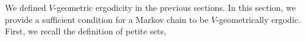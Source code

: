 \documentclass[11pt]{amsart}
\newcommand{\psirr}{$\psi$-irreducible }
\newtheorem{defn}{Definition}[section]
\begin{document}





We defined $V$-geometric ergodicity in the previous sections. In this section, we provide a sufficient condition for a Markov chain to be $V$-geometrically ergodic. First, we recall the definition of petite sets,

\end{document}
